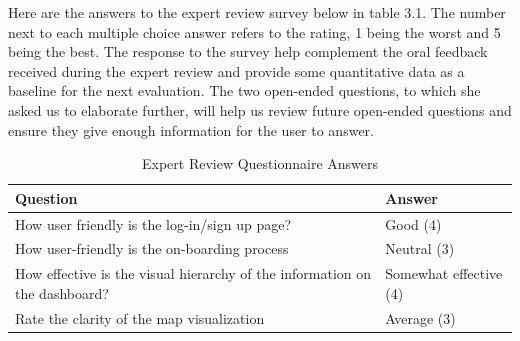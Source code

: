 \documentclass{report}
\begin{document}
Here are the answers to the expert review survey below in table 3.1. The number next to each multiple choice answer refers to the rating, 1 being the worst and 5 being the best. The response to the survey help complement the oral feedback received during the expert review and provide some quantitative data as a baseline for the next evaluation. The two open-ended questions, to which she asked us to elaborate further, will help us review future open-ended questions and ensure they give enough information for the user to answer.
\begin{table}[h!]
    \centering
    \caption{Expert Review Questionnaire Answers}
    \label{tab:table4}
    \begin{tabularx}{\textwidth}{|p{}|X|}
        \hline
        \textbf{Question}                                                                                                        & \textbf{Answer}                                                                                                                                                                                                       \\ \hline
        How user friendly is the log-in/sign up page?                                                                            & Good (4)                                                                                                                                                                                                              \\ \hline
        How user-friendly is the on-boarding process                                                                             & Neutral (3)                                                                                                                                                                                                           \\ \hline
        How effective is the visual hierarchy of the information on the dashboard?                                               & Somewhat effective (4)                                                                                                                                                                                                \\ \hline
        Rate the clarity of the map visualization                                                                                & Average (3)                                                                                                                                                                                                           \\ \hline

\end{tabularx}
\end{table}
\end{document}
